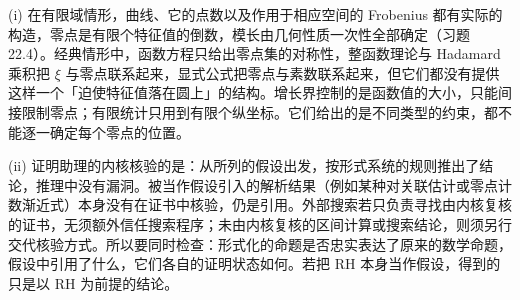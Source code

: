 \documentclass[11pt,a4paper]{article}
\begin{document}
(i) 在有限域情形，曲线、它的点数以及作用于相应空间的 Frobenius 都有实际的构造，零点是有限个特征值的倒数，模长由几何性质一次性全部确定（习题 22.4）。经典情形中，函数方程只给出零点集的对称性，整函数理论与 Hadamard 乘积把 $\xi$ 与零点联系起来，显式公式把零点与素数联系起来，但它们都没有提供这样一个「迫使特征值落在圆上」的结构。增长界控制的是函数值的大小，只能间接限制零点；有限统计只用到有限个纵坐标。它们给出的是不同类型的约束，都不能逐一确定每个零点的位置。

(ii) 证明助理的内核核验的是：从所列的假设出发，按形式系统的规则推出了结论，推理中没有漏洞。被当作假设引入的解析结果（例如某种对关联估计或零点计数渐近式）本身没有在证书中核验，仍是引用。外部搜索若只负责寻找由内核复核的证书，无须额外信任搜索程序；未由内核复核的区间计算或搜索结论，则须另行交代核验方式。所以要同时检查：形式化的命题是否忠实表达了原来的数学命题，假设中引用了什么，它们各自的证明状态如何。若把 RH 本身当作假设，得到的只是以 RH 为前提的结论。
\end{document}
